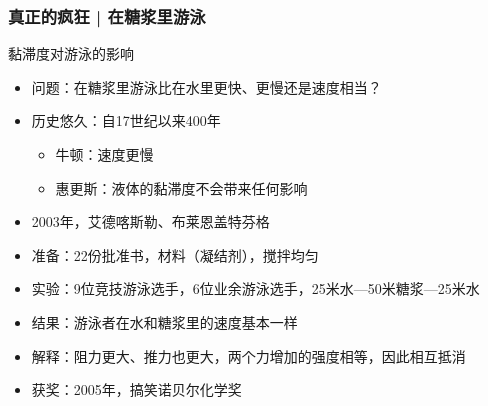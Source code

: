 \begin{frame}
  \frametitle{真正的疯狂 | 在糖浆里游泳}
  \begin{block}{黏滞度对游泳的影响}
    \begin{itemize}
      \item 问题：在糖浆里游泳比在水里更快、更慢还是速度相当？
    \pause
      \item 历史悠久：自17世纪以来400年
        \begin{itemize}
          \item 牛顿：速度更慢
          \item 惠更斯：液体的黏滞度不会带来任何影响
        \end{itemize}
      \item 2003年，艾德\textbullet 喀斯勒、布莱恩盖\textbullet 特芬格
      \item 准备：22份批准书，材料（凝结剂），搅拌均匀
      \item 实验：9位竞技游泳选手，6位业余游泳选手，25米水—50米糖浆—25米水
      \item 结果：游泳者在水和糖浆里的速度基本一样
      \item 解释：阻力更大、推力也更大，两个力增加的强度相等，因此相互抵消
      \item 获奖：2005年，搞笑诺贝尔化学奖
    \end{itemize}
  \end{block}
\end{frame}



